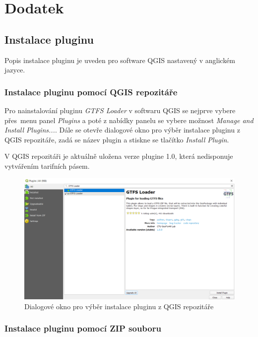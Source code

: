 \chapter{Dodatek}
\label{dodatek}

\section{Instalace pluginu}

Popis instalace pluginu je uveden pro software QGIS nastavený v anglickém jazyce. 

\subsection{Instalace pluginu pomocí QGIS repozitáře}

Pro nainstalování pluginu \textit{GTFS Loader} v softwaru QGIS se nejprve vybere přes~me\-nu 
panel \textit{Plugins} a poté z nabídky panelu se vybere možnost \textit{Manage and Install Plugins...}.
Dále se otevře dialogové okno pro výběr instalace pluginu z QGIS repo\-zitáře, zadá se název
plugin a stiskne se tlačítko \textit{Install Plugin}.

V QGIS repozitáři je aktuálně uložena verze plugine 1.0, která nedisponuje vytvářením
tarifních pásem.  

\begin{figure}[H] \centering
    \includegraphics[width=400pt]{./pictures-dodatek/repositary.png}
    \caption[Dialogové okno pro výběr instalace pluginu z QGIS repozitáře]{Dialogové okno pro výběr instalace pluginu z QGIS repozitáře}
	\label{fig:repositary}              
\end{figure} 

\subsection{Instalace pluginu pomocí ZIP souboru}

